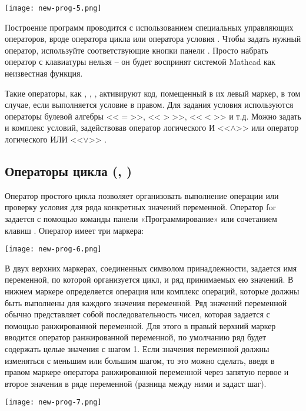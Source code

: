 \begin{center}
	\texttt{[image: new-prog-5.png]}
\end{center}

Построение программ проводится с использованием специальных управляющих операторов, вроде оператора цикла  или оператора условия . Чтобы задать нужный оператор, используйте соответствующие кнопки панели . Просто набрать оператор с клавиатуры нельзя – он будет воспринят системой Mathcad как неизвестная функция.

Такие операторы, как , , , активируют код, помещенный в их левый маркер, в том случае, если выполняется условие в правом. Для задания условия используются операторы булевой алгебры <<$=$>>, <<$>$>>, <<$<$>> и т.д. Можно задать и комплекс условий, задействовав оператор логического И <<$\land$>> или оператор логического ИЛИ <<$\lor$>> .

\subsection*{Операторы цикла (, )}

Оператор простого цикла  позволяет организовать выполнение операции или проверку условия для ряда конкретных значений переменной. Оператор for задается с помощью команды панели «Программирование» или сочетанием клавиш . Оператор  имеет три маркера:
\begin{center}
	\texttt{[image: new-prog-6.png]}
\end{center}


В двух верхних маркерах, соединенных символом принадлежности, задается имя переменной, по которой организуется цикл, и ряд принимаемых ею значений. В нижнем маркере определяется операция или комплекс операций, которые должны быть выполнены для каждого значения переменной. Ряд значений переменной обычно представляет собой последовательность чисел, которая задается с помощью ранжированной переменной. Для этого в правый верхний маркер вводится оператор ранжированной переменной, по умолчанию ряд будет содержать целые значения с шагом 1. Если значения переменной должны изменяться с меньшим или большим шагом, то это можно сделать, введя в правом маркере оператора ранжированной переменной через запятую первое и второе значения в ряде переменной (разница между ними и задаст шаг).
\begin{center}
	\texttt{[image: new-prog-7.png]}
\end{center}


